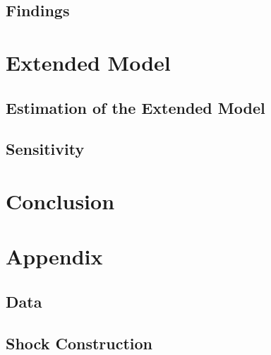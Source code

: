 \documentclass[12pt,a4paper,leqno]{article}
\begin{document}
\subsection{Findings}
\label{sec:findings}


\section{Extended Model}
\label{sec:extended_model}

\subsection{Estimation of the Extended Model}
\label{sec:estimation_extended_model}

\subsection{Sensitivity}
\label{sec:sensitivity}

\section{Conclusion}
\label{sec:conclusion}

\newpage
\vfill
{}




\newpage
\appendix
\section*{Appendix}
\renewcommand{\thesubsection}{\Alph{subsection}}

\renewcommand{\thetable}{\Alph{subsection}\arabic{table}}
\renewcommand{\thefigure}{\Alph{subsection}\arabic{figure}}


\subsection{Data}
\label{sec:appendix_data}


\subsection{Shock Construction}
\label{sec:appendix_shock_construction}

\end{document}
